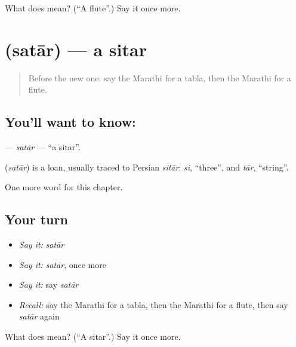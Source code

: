 \begin{tcolorbox}[breakable,colback=teal!4,colframe=teal!35!black,title={Before you move on}]
What does  mean? (\textquotedblleft{}A flute\textquotedblright{}.) Say it once more.
\end{tcolorbox}
\section[\texorpdfstring{\mr{सतार} (satār)}{सतार (satār)}]{ (satār) — a sitar}

\label{lesson:MR-C268-satar}



\begin{quote}
Before the new one: say the Marathi for a tabla, then the Marathi for a flute.
\end{quote}

\subsection*{You'll want to know: }
\textbf{} — \emph{satār} — \textquotedblleft{}a sitar\textquotedblright{}.

\begin{cousinweb}
\textbf{} (\emph{satār}) is a loan, usually traced to Persian \emph{sitār}: \emph{si}, \textquotedblleft{}three\textquotedblright{}, and \emph{tār}, \textquotedblleft{}string\textquotedblright{}.
\end{cousinweb}

\begin{grammarlens}[title={What you've built}]
One more word for this chapter.
\end{grammarlens}

\subsection*{Your turn}
\begin{itemize}
\raggedright
  \item \emph{Say it:} \emph{satār}
  \item \emph{Say it:} \emph{satār}, once more
  \item \emph{Say it:} say \emph{satār}
  \item \emph{Recall:} say the Marathi for a tabla, then the Marathi for a flute, then say \emph{satār} again
\end{itemize}

\begin{tcolorbox}[breakable,colback=teal!4,colframe=teal!35!black,title={Before you move on}]
What does  mean? (\textquotedblleft{}A sitar\textquotedblright{}.) Say it once more.
\end{tcolorbox}
